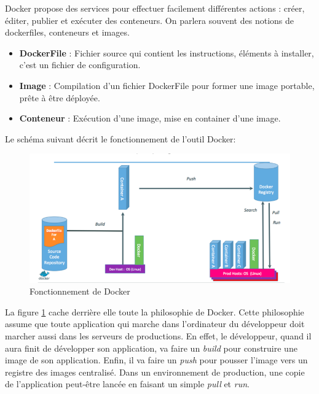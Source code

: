 \begin{onehalfspace}
Docker propose des services pour effectuer facilement différentes actions : créer, éditer, publier et exécuter des conteneurs. On parlera souvent des notions de dockerfiles, conteneurs et  images.

\begin{itemize}
\item \textbf{DockerFile} : Fichier source qui contient les instructions, éléments à installer, c'est un fichier de configuration.
\item \textbf{Image} : Compilation d'un fichier DockerFile pour former une image portable, prête à être déployée.
\item \textbf{Conteneur} : Exécution d'une image, mise en container d'une image.
\end{itemize}


Le schéma suivant décrit le fonctionnement de l'outil Docker: 
\begin{figure}[H]
\centering
\includegraphics [scale=0.6]{chapitre2/assets/utilisation.png}
\caption{Fonctionnement de Docker}
\label{fig:fonctionnement-docker}
\end{figure}

\end{onehalfspace}


La figure \ref{fig:fonctionnement-docker} cache derrière elle toute la philosophie de Docker. Cette philosophie assume que toute application qui marche dans l'ordinateur du développeur doit marcher aussi dans les serveurs de productions. En effet, le développeur, quand il aura finit de développer son application, va faire un \emph{build} pour construire une image de son application. Enfin, il va faire un \emph{push} pour pousser l'image vers un registre des images centralisé. Dans un environnement de production, une copie de l'application peut-être lancée en faisant un simple \emph{pull} et \emph{run}.